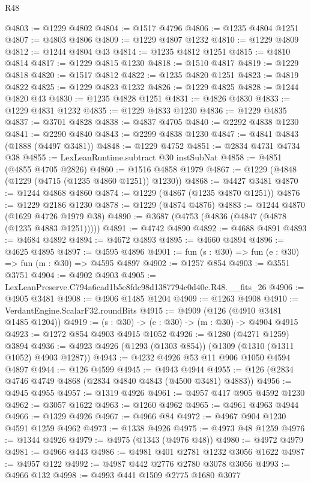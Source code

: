 \begin{lexlean}{R48}
\begin{coremodule}
@4803 := @1229 @4802
@4804 := @1517 @4796
@4806 := @1235 @4804 @1251
@4807 := @4803 @4806
@4809 := @1229 @4807 @1232
@4810 := @1229 @4809
@4812 := @1244 @4804 @43
@4814 := @1235 @4812 @1251
@4815 := @4810 @4814
@4817 := @1229 @4815 @1230
@4818 := @1510 @4817
@4819 := @1229 @4818
@4820 := @1517 @4812
@4822 := @1235 @4820 @1251
@4823 := @4819 @4822
@4825 := @1229 @4823 @1232
@4826 := @1229 @4825
@4828 := @1244 @4820 @43
@4830 := @1235 @4828 @1251
@4831 := @4826 @4830
@4833 := @1229 @4831 @1232
@4835 := @1229 @4833 @1230
@4836 := @1229 @4835
@4837 := @3701 @4828
@4838 := @4837 @4705
@4840 := @2292 @4838 @1230
@4841 := @2290 @4840
@4843 := @2299 @4838 @1230
@4847 := @4841 @4843 (@1888 (@4497 @3481))
@4848 := @1229 @4752
@4851 := @2834 @4731 @4734 @38
@4855 := LexLeanRuntime.subtract @30 instSubNat
@4858 := @4851 (@4855 @4705 @2826)
@4860 := @1516 @4858 @1979
@4867 := @1229 (@4848 (@1229 (@4715 (@1235 @4860 @1251)) @1230))
@4868 := @4427 @3481
@4870 := @1244 @4868 @4860
@4874 := @1229 (@4867 (@1235 @4870 @1251))
@4876 := @1229 @2186 @1230
@4878 := @1229 (@4874 @4876)
@4883 := @1244 @4870 (@1629 @4726 @1979 @38)
@4890 := @3687 (@4753 (@4836 (@4847 (@4878 (@1235 @4883 @1251)))))
@4891 := @4742 @4890
@4892 := @4688 @4891
@4893 := @4684 @4892
@4894 := @4672 @4893
@4895 := @4660 @4894
@4896 := @4625 @4895
@4897 := @4595 @4896
@4901 := fun (s : @30) => fun (e : @30) => fun (m : @30) => @4595 @4897
@4902 := @1257 @854
@4903 := @3551 @3751
@4904 := @4902 @4903
@4905 := LexLeanPreserve.C794a6cad1b5e8fdc98d1387794c0d40c.R48.__fits_26
@4906 := @4905 @3481
@4908 := @4906 @1485 @1204
@4909 := @1263 @4908
@4910 := VerdantEngine.ScalarF32.roundBits
@4915 := @4909 (@126 (@4910 @3481 @1485 @1204))
@4919 := (s : @30) -> (e : @30) -> (m : @30) -> @4904 @4915
@4923 := @1272 @854 @4903 @4915 @1052
@4926 := @1280 (@4271 @1259) @3894
@4936 := @4923 @4926 (@1293 (@1303 @854)) (@1309 (@1310 (@1311 @1052) @4903 @1287))
@4943 := @4232 @4926 @53 @11 @906 @1050 @4594 @4897
@4944 := @126 @4599
@4945 := @4943 @4944
@4955 := @126 (@2834 @4746 @4749 @4868 (@2834 @4840 @4843 (@4500 @3481) @4883))
@4956 := @4945 @4955
@4957 := @1319 @4926
@4961 := @4957 @417 @905 @4592 @1230
@4962 := @3057 @1622
@4963 := @1260 @4962
@4965 := @4961 @4963 @4944
@4966 := @1329 @4926
@4967 := @4966 @84
@4972 := @4967 @904 @1230 @4591 @1259 @4962
@4973 := @1338 @4926
@4975 := @4973 @48 @1259
@4976 := @1344 @4926
@4979 := @4975 (@1343 (@4976 @48))
@4980 := @4972 @4979
@4981 := @4966 @443
@4986 := @4981 @401 @2781 @1232 @3056 @1622
@4987 := @4957 @122
@4992 := @4987 @442 @2776 @2780 @3078 @3056
@4993 := @4966 @132
@4998 := @4993 @441 @1509 @2775 @1680 @3077

\end{coremodule}
\end{lexlean}
